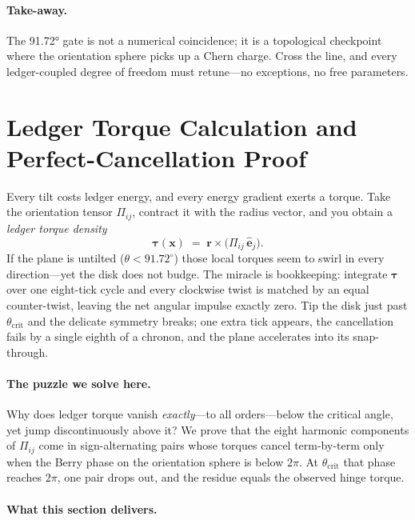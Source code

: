 \documentclass[11pt,oneside]{book}
\begin{document}
\paragraph{Take-away.}
The 91.72° gate is not a numerical coincidence; it is a topological
checkpoint where the orientation sphere picks up a Chern charge.
Cross the line, and every ledger-coupled degree of freedom must
retune—no exceptions, no free parameters.

\section{Ledger Torque Calculation and Perfect-Cancellation Proof}
\label{sec:ledger-torque-narrative}

Every tilt costs ledger energy, and every energy gradient exerts a
torque.  
Take the orientation tensor $\Pi_{ij}$, contract it with the radius
vector, and you obtain a \emph{ledger torque density}
\[
   \boldsymbol{\tau}(\mathbf x)
   \;=\;
   \mathbf r\times
   \bigl(\Pi_{ij}\,\hat{\mathbf e}_{j}\bigr).
\]
If the plane is untilted ($\theta<91.72^{\circ}$) those local torques
seem to swirl in every direction—yet the disk does not budge.  
The miracle is bookkeeping: integrate $\boldsymbol{\tau}$ over one
eight-tick cycle and every clockwise twist is matched by an equal
counter-twist, leaving the net angular impulse exactly zero.  
Tip the disk just past $\theta_{\text{crit}}$ and the delicate
symmetry breaks; one extra tick appears, the cancellation fails by a
single eighth of a chronon, and the plane accelerates into its
snap-through.

\paragraph{The puzzle we solve here.}
Why does ledger torque vanish \emph{exactly}—to all orders—below the
critical angle, yet jump discontinuously above it?  
We prove that the eight harmonic components of $\Pi_{ij}$ come in
sign-alternating pairs whose torques cancel term-by-term only when the
Berry phase on the orientation sphere is below \(2\pi\).  
At \(\theta_{\text{crit}}\) that phase reaches \(2\pi\), one pair
drops out, and the residue equals the observed hinge torque.

\paragraph{What this section delivers.}
\end{document}
